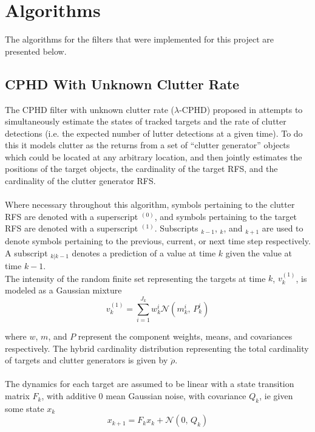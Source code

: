 \documentclass{article}
\begin{document}
\section{Algorithms}

The algorithms for the filters that were implemented for this project are presented below.

\subsection{CPHD With Unknown Clutter Rate}
The CPHD filter with unknown clutter rate ($\lambda$-CPHD) proposed in \cite{cphd} attempts to simultaneously estimate the states of tracked targets and the rate of clutter detections (i.e. the expected number of lutter detections at a given time). To do this it models clutter as the returns from a set of ``clutter generator'' objects which could be located at any arbitrary location, and then jointly estimates the positions of the target objects, the cardinality of the target RFS, and the cardinality of the clutter generator RFS. \\
\\
Where necessary throughout this algorithm, symbols pertaining to the clutter RFS are denoted with a superscript $^{(0)}$, and symbols pertaining to the target RFS are denoted with a superscript $^{(1)}$. Subscripts $_{k-1}$, $_k$, and $_{k+1}$ are used to denote symbols pertaining to the previous, current, or next time step respectively. A subscript $_{k|k-1}$ denotes a prediction of a value at time $k$ given the value at time $k-1$.
\\
The intensity of the random finite set representing the targets at time $k$, $v^{(1)}_k$, is modeled as a Gaussian mixture
\begin{equation}
  \label{eq:vk-1}
  v^{(1)}_k = \sum_{i = 1}^{J_k}w_k^i \mathcal{N}(m_k^i,\,P_k^i)
\end{equation}

where $w$, $m$, and $P$ represent the component weights, means, and covariances respectively. The hybrid cardinality distribution representing the total cardinality of targets and clutter generators is given by $\ddot{\rho}$. \\
\\
The dynamics for each target are assumed to be linear with a state transition matrix $F_k$, with additive 0 mean Gaussian noise, with covariance $Q_k$, ie given some state $x_k$
\begin{equation}
  \label{eq:tgt_dynamics}
  x_{k+1} = F_kx_k + \mathcal{N}(0,\,Q_k)
\end{equation}
\end{document}
